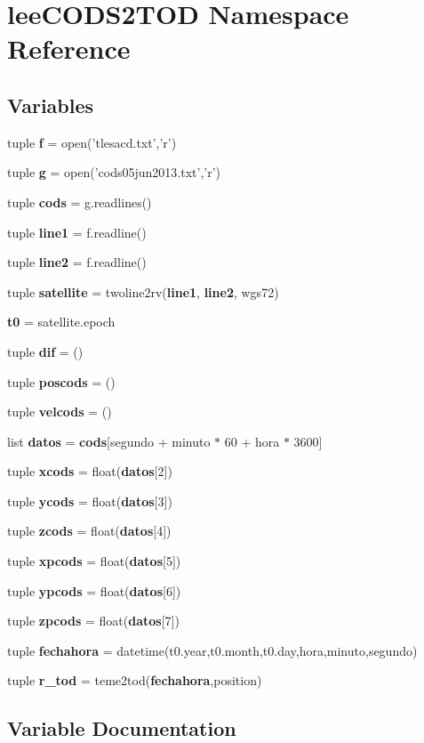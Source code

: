 \section{lee\-C\-O\-D\-S2\-T\-O\-D \-Namespace \-Reference}
\label{namespacelee_c_o_d_s2_t_o_d}
\subsection*{\-Variables}
\begin{DoxyCompactItemize}
\item 
tuple {\bf f} = open('tlesacd.\-txt','r')
\item 
tuple {\bf g} = open('cods05jun2013.\-txt','r')
\item 
tuple {\bf cods} = g.\-readlines()
\item 
tuple {\bf line1} = f.\-readline()
\item 
tuple {\bf line2} = f.\-readline()
\item 
tuple {\bf satellite} = twoline2rv({\bf line1}, {\bf line2}, wgs72)
\item 
{\bf t0} = satellite.\-epoch
\item 
tuple {\bf dif} = ()
\item 
tuple {\bf poscods} = ()
\item 
tuple {\bf velcods} = ()
\item 
list {\bf datos} = {\bf cods}[segundo + minuto $\ast$ 60 + hora $\ast$ 3600]
\item 
tuple {\bf xcods} = float({\bf datos}[2])
\item 
tuple {\bf ycods} = float({\bf datos}[3])
\item 
tuple {\bf zcods} = float({\bf datos}[4])
\item 
tuple {\bf xpcods} = float({\bf datos}[5])
\item 
tuple {\bf ypcods} = float({\bf datos}[6])
\item 
tuple {\bf zpcods} = float({\bf datos}[7])
\item 
tuple {\bf fechahora} = datetime(t0.\-year,t0.\-month,t0.\-day,hora,minuto,segundo)
\item 
tuple {\bf r\-\_\-tod} = teme2tod({\bf fechahora},position)
\end{DoxyCompactItemize}


\subsection{\-Variable \-Documentation}
